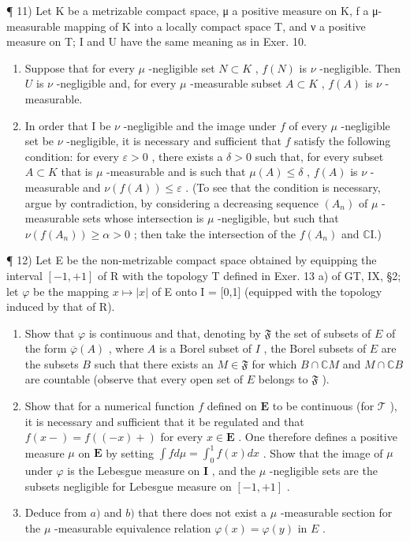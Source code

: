 ¶ 11) Let K be a metrizable compact space, μ a positive measure on K, f a μ-measurable mapping of K into a locally compact space T, and ν a positive measure on T; I and U have the same meaning as in Exer. 10.

\begin{enumerate}
\def\labelenumi{\alph{enumi})}
\item
  Suppose that for every \(\mu\) -negligible set \(N \subset K\) , \(f(N)\) is \(\nu\) -negligible. Then \(U\) is \(\nu\) -negligible and, for every \(\mu\) -measurable subset \(A \subset K\) , \(f(A)\) is \(\nu\) -measurable.
\item
  In order that I be \(\nu\) -negligible and the image under \(f\) of every \(\mu\) -negligible set be \(\nu\) -negligible, it is necessary and sufficient that \(f\) satisfy the following condition: for every \(\varepsilon > 0\) , there exists a \(\delta > 0\) such that, for every subset \(A \subset K\) that is \(\mu\) -measurable and is such that \(\mu(A) \leqslant \delta\) , \(f(A)\) is \(\nu\) -measurable and \(\nu(f(A)) \leqslant \varepsilon\) . (To see that the condition is necessary, argue by contradiction, by considering a decreasing sequence \((A_n)\) of \(\mu\) -measurable sets whose intersection is \(\mu\) -negligible, but such that \(\nu(f(A_n)) \geqslant \alpha > 0\) ; then take the intersection of the \(f(A_n)\) and \(\mathbb{C}\mathrm{I}\).)
\end{enumerate}

¶ 12) Let E be the non-metrizable compact space obtained by equipping the interval \([-1,+1]\) of R with the topology T defined in Exer. 13 a) of GT, IX, §2; let \(\varphi\) be the mapping \(x \mapsto |x|\) of E onto I = {[}0,1{]} (equipped with the topology induced by that of R).

\begin{enumerate}
\def\labelenumi{\alph{enumi})}
\item
  Show that \(\varphi\) is continuous and that, denoting by \(\mathfrak{F}\) the set of subsets of \(E\) of the form \(\overline{\varphi}(A)\) , where \(A\) is a Borel subset of \(I\) , the Borel subsets of \(E\) are the subsets \(B\) such that there exists an \(M \in \mathfrak{F}\) for which \(B \cap \mathbb{C}M\) and \(M \cap \mathbb{C}B\) are countable (observe that every open set of \(E\) belongs to \(\mathfrak{F}\) ).
\item
  Show that for a numerical function \(f\) defined on \(\mathbf{E}\) to be continuous (for \(\mathcal{T}\) ), it is necessary and sufficient that it be regulated and that \(f(x-) = f((-x)+)\) for every \(x \in \mathbf{E}\) . One therefore defines a positive measure \(\mu\) on \(\mathbf{E}\) by setting \(\int f d\mu = \int_0^1 f(x) dx\) . Show that the image of \(\mu\) under \(\varphi\) is the Lebesgue measure on \(\mathbf{I}\) , and the \(\mu\) -negligible sets are the subsets negligible for Lebesgue measure on \([-1, +1]\) .
\item
  Deduce from \(a)\) and \(b)\) that there does not exist a \(\mu\) -measurable section for the \(\mu\) -measurable equivalence relation \(\varphi(x) = \varphi(y)\) in \(E\) .
\end{enumerate}

